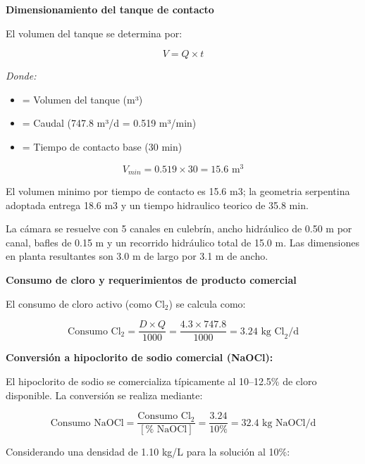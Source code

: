 \documentclass[12pt,a4paper]{article}
\begin{document}
\textbf{Dimensionamiento del tanque de contacto}

El volumen del tanque se determina por:

\begin{equation}
V = Q \times t
\end{equation}

\textit{Donde:}
\begin{itemize}[noitemsep,leftmargin=2em]
    \item[$V$] = Volumen del tanque (m³)
    \item[$Q$] = Caudal (747.8 m³/d = 0.519 m³/min)
    \item[$t$] = Tiempo de contacto base (30 min)
\end{itemize}

\begin{equation}
V_{min} = 0.519 \times 30 = 15.6 \text{ m}^3
\end{equation}

El volumen minimo por tiempo de contacto es 15.6 m3; la geometria serpentina adoptada entrega 18.6 m3 y un tiempo hidraulico teorico de 35.8 min.

La cámara se resuelve con 5 canales en culebrín, ancho hidráulico de 0.50 m por canal, bafles de 0.15 m y un recorrido hidráulico total de 15.0 m. Las dimensiones en planta resultantes son 3.0 m de largo por 3.1 m de ancho.

\textbf{Consumo de cloro y requerimientos de producto comercial}

El consumo de cloro activo (como Cl$_2$) se calcula como:

\begin{equation}
\text{Consumo Cl}_2 = \frac{D \times Q}{1000} = \frac{4.3 \times 747.8}{1000} = 3.24 \text{ kg Cl}_2\text{/d}
\end{equation}

\textbf{Conversión a hipoclorito de sodio comercial (NaOCl):}

El hipoclorito de sodio se comercializa típicamente al 10--12.5\% de cloro disponible. La conversión se realiza mediante:

\begin{equation}
\text{Consumo NaOCl} = \frac{\text{Consumo Cl}_2}{[\% \text{ NaOCl}]} = \frac{3.24}{10\%} = 32.4 \text{ kg NaOCl/d}
\end{equation}

Considerando una densidad de 1.10 kg/L para la solución al 10\%:
\end{document}
